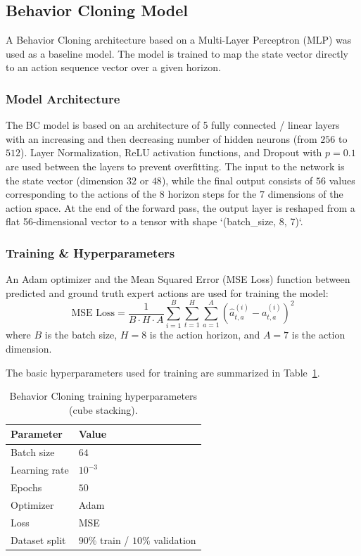 \documentclass[11pt,a4paper]{article}
\begin{document}
\subsection{Behavior Cloning Model}

A Behavior Cloning architecture based on a Multi-Layer Perceptron (MLP) was used as a baseline model. The model is trained to map the state vector directly to an action sequence vector over a given horizon.

\subsubsection{Model Architecture}
The BC model is based on an architecture of 5 fully connected / linear layers with an increasing and then decreasing number of hidden neurons (from $256$ to $512$). Layer Normalization, ReLU activation functions, and Dropout with $p=0.1$ are used between the layers to prevent overfitting. The input to the network is the state vector (dimension $32$ or $48$), while the final output consists of $56$ values corresponding to the actions of the $8$ horizon steps for the $7$ dimensions of the action space.
At the end of the forward pass, the output layer is reshaped from a flat 56-dimensional vector to a tensor with shape `(batch\_size, 8, 7)`.


\subsubsection{Training \& Hyperparameters}
An Adam optimizer and the Mean Squared Error (MSE Loss) function between predicted and ground truth expert actions are used for training the model:
\[ \text{MSE Loss} = \frac{1}{B \cdot H \cdot A} \sum_{i=1}^{B} \sum_{t=1}^{H} \sum_{a=1}^{A} \left( \hat{a}_{t,a}^{(i)} - a_{t,a}^{(i)} \right)^2 \]
where $B$ is the batch size, $H = 8$ is the action horizon, and $A = 7$ is the action dimension.

The basic hyperparameters used for training are summarized in Table~\ref{tab:bc_hyperparams}.

\begin{table}[htbp]
  \centering
  \caption{Behavior Cloning training hyperparameters (cube stacking).}
  \label{tab:bc_hyperparams}
  \begin{tabular}{@{}ll@{}}
    \toprule
    \textbf{Parameter} & \textbf{Value} \\
    \midrule
    Batch size    & $64$ \\
    Learning rate & $10^{-3}$ \\
    Epochs        & $50$ \\
    Optimizer     & Adam \\
    Loss          & MSE \\
    Dataset split & $90\%$ train / $10\%$ validation \\
    \bottomrule
  \end{tabular}
\end{table}
\end{document}
